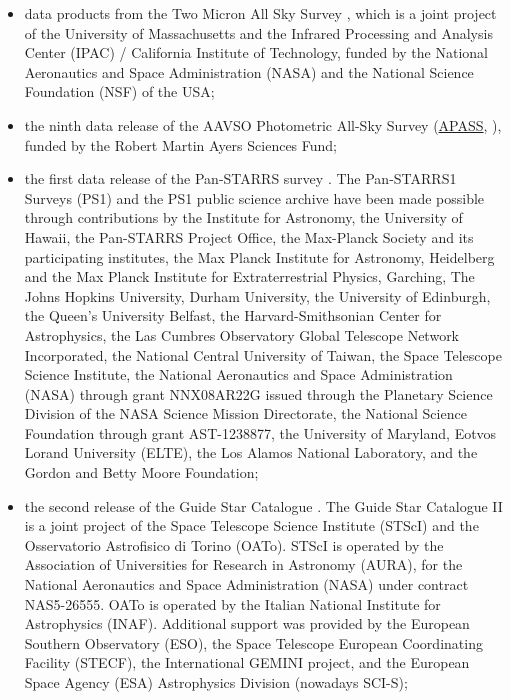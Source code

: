 \documentclass[longauth]{aa}
\begin{document}
\begin{appendix}
\begin{itemize}
\item data products from the Two Micron All Sky Survey \citep[2MASS,][]{2006AJ....131.1163S}, which is a joint project of the University of Massachusetts and the Infrared Processing and Analysis Center (IPAC) / California Institute of Technology, funded by the National Aeronautics and Space Administration (NASA) and the National Science Foundation (NSF) of the USA;
\item the ninth data release of the AAVSO Photometric All-Sky Survey (\href{https://www.aavso.org/apass}{APASS}, \citealt{apass9}), funded by the Robert Martin Ayers Sciences Fund;
\item the first data release of the Pan-STARRS survey \citep{panstarrs1,panstarrs1b,panstarrs1c,panstarrs1d,panstarrs1e,panstarrs1f}. The Pan-STARRS1 Surveys (PS1) and the PS1 public science archive have been made possible through contributions by the Institute for Astronomy, the University of Hawaii, the Pan-STARRS Project Office, the Max-Planck Society and its participating institutes, the Max Planck Institute for Astronomy, Heidelberg and the Max Planck Institute for Extraterrestrial Physics, Garching, The Johns Hopkins University, Durham University, the University of Edinburgh, the Queen's University Belfast, the Harvard-Smithsonian Center for Astrophysics, the Las Cumbres Observatory Global Telescope Network Incorporated, the National Central University of Taiwan, the Space Telescope Science Institute, the National Aeronautics and Space Administration (NASA) through grant NNX08AR22G issued through the Planetary Science Division of the NASA Science Mission Directorate, the National Science Foundation through grant AST-1238877, the University of Maryland, Eotvos Lorand University (ELTE), the Los Alamos National Laboratory, and the Gordon and Betty Moore Foundation;
\item the second release of the Guide Star Catalogue \citep[GSC2.3,][]{2008AJ....136..735L}. The Guide Star Catalogue II is a joint project of the Space Telescope Science Institute (STScI) and the Osservatorio Astrofisico di Torino (OATo). STScI is operated by the Association of Universities for Research in Astronomy (AURA), for the National Aeronautics and Space Administration (NASA) under contract NAS5-26555. OATo is operated by the Italian National Institute for Astrophysics (INAF). Additional support was provided by the European Southern Observatory (ESO), the Space Telescope European Coordinating Facility (STECF), the International GEMINI project, and the European Space Agency (ESA) Astrophysics Division (nowadays SCI-S);

\end{itemize}
\end{appendix}
\end{document}
